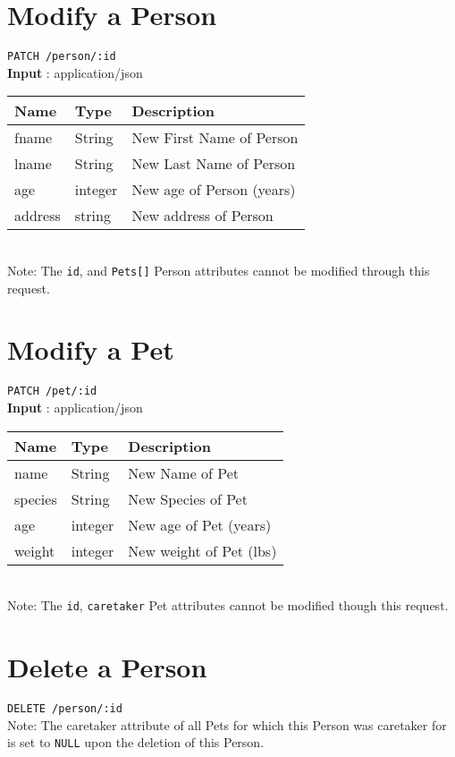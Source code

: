 \documentclass{article}
\begin{document}
\section*{Modify a Person}
\texttt{PATCH /person/:id} \\
\textbf{Input} : application/json \\
\begin{tabular}{| l | l | l |}
	\hline
	\textbf{Name} & \textbf{Type} & \textbf{Description} \\
	\hline
	fname         & String        & New First Name of Person \\
	\hline
	lname         & String        & New Last Name of Person \\
	\hline
	age           & integer       & New age of Person (years) \\
	\hline
	address       & string        & New address of Person \\
	\hline
\end{tabular}
\\
Note: The \texttt{id}, and \texttt{Pets[]}
Person attributes cannot be modified through this request.

\section*{Modify a Pet}
\texttt{PATCH /pet/:id} \\
\textbf{Input} : application/json \\
\begin{tabular}{| l | l | l |}
	\hline
	\textbf{Name} & \textbf{Type} & \textbf{Description} \\
	\hline
	name          & String         & New Name of Pet \\
	\hline
	species       & String         & New Species of Pet \\
	\hline
	age           & integer        & New age of Pet (years) \\
	\hline
	weight        & integer        & New weight of Pet (lbs) \\
	\hline
\end{tabular}
\\
Note: The \texttt{id}, \texttt{caretaker} 
Pet attributes cannot be modified though this request.

\section*{Delete a Person}
\texttt{DELETE /person/:id} \\
Note: The caretaker attribute of all Pets for which this Person was caretaker for
is set to \texttt{NULL} upon the deletion of this Person.
\end{document}
